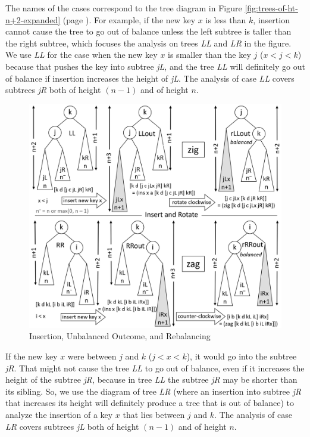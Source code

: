 The names of the cases correspond
to the tree diagram in
Figure \ref{fig:trees-of-ht-n+2-expanded} (page \pageref{fig:trees-of-ht-n+2-expanded}).
For example, if the new key $x$ is less than $k$,
insertion cannot cause the tree to go out of
balance unless the left subtree is taller
than the right subtree, which focuses the
analysis on trees \emph{LL} and \emph{LR}
in the figure.
We use \emph{LL} for the case when the new key $x$
is smaller than the key $j$
($x < j < k$)
because that pushes the key into subtree \emph{jL},
and the tree \emph{LL} will definitely go out of balance
if insertion increases the height of \emph{jL}.
The analysis of case \emph{LL} covers
subtrees \emph{jR} both of height $(n-1)$ and of height $n$.

\begin{figure}
\begin{center}
\includegraphics[scale=1]{images-cmyk/zig-and-zag}
\end{center}
\caption{Insertion, Unbalanced Outcome, and Rebalancing}
\label{fig:zig-and-zag}
\end{figure}

If the new key $x$ were between $j$ and $k$ ($j < x < k$),
it would go into the subtree \emph{jR}.
That might not cause the tree \emph{LL} to go out of balance,
even if it increases the height of
the subtree \emph{jR}, because in tree \emph{LL}
the subtree \emph{jR} may be shorter than its sibling.
So, we use the diagram of tree \emph{LR}
(where an insertion into subtree \emph{jR}
that increases its height will definitely
produce a tree that is out of balance)
to analyze the insertion of a
key $x$ that lies between $j$ and $k$.
The analysis of case \emph{LR} covers
subtrees \emph{jL} both of height $(n-1)$ and of height $n$.

